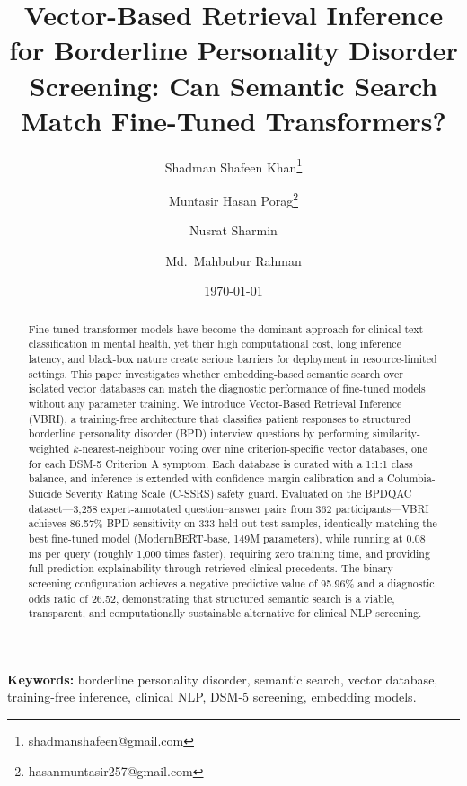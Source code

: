 \documentclass[11pt]{article}
\title{\textbf{Vector-Based Retrieval Inference for Borderline Personality Disorder Screening:
Can Semantic Search Match Fine-Tuned Transformers?}}
\author[1]{Shadman Shafeen Khan\thanks{shadmanshafeen@gmail.com}}
\author[1]{Muntasir Hasan Porag\thanks{hasanmuntasir257@gmail.com}}
\author[1]{Nusrat Sharmin}
\author[1]{Md.\ Mahbubur Rahman}
\affil[1]{Department of Computer Science and Engineering, Military Institute of Science and Technology,
Mirpur Cantonment, Dhaka 1216, Bangladesh}
\date{\today}
\newcommand{\vbri}{VBRI}
\newcommand{\bpdqac}{BPDQAC}
\newcommand{\dsmv}{DSM-5}
\begin{document}
\maketitle

\begin{abstract}
Fine-tuned transformer models have become the dominant approach for clinical text classification
in mental health, yet their high computational cost, long inference latency, and black-box nature
create serious barriers for deployment in resource-limited settings. This paper investigates
whether embedding-based semantic search over isolated vector databases can match the diagnostic
performance of fine-tuned models without any parameter training. We introduce Vector-Based
Retrieval Inference (\vbri{}), a training-free architecture that classifies patient responses to
structured borderline personality disorder (BPD) interview questions by performing
similarity-weighted $k$-nearest-neighbour voting over nine criterion-specific vector databases,
one for each \dsmv{} Criterion A symptom. Each database is curated with a 1:1:1 class balance,
and inference is extended with confidence margin calibration and a Columbia-Suicide Severity
Rating Scale (C-SSRS) safety guard. Evaluated on the \bpdqac{} dataset---3,258 expert-annotated
question--answer pairs from 362 participants---\vbri{} achieves 86.57\% BPD sensitivity on 333
held-out test samples, identically matching the best fine-tuned model (ModernBERT-base, 149M
parameters), while running at 0.08\,ms per query (roughly 1,000 times faster), requiring zero
training time, and providing full prediction explainability through retrieved clinical precedents.
The binary screening configuration achieves a negative predictive value of 95.96\% and a
diagnostic odds ratio of 26.52, demonstrating that structured semantic search is a viable,
transparent, and computationally sustainable alternative for clinical NLP screening.
\end{abstract}

\noindent\textbf{Keywords:} borderline personality disorder, semantic search, vector database,
training-free inference, clinical NLP, \dsmv{} screening, embedding models.

\end{document}

